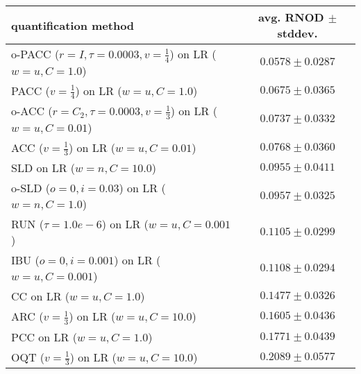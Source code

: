 \begin{tabular}{lc}
  \toprule
  quantification method & avg. RNOD $\pm$ stddev. \\
  \midrule
  o-PACC ($r=I, \tau=0.0003, v=\frac{1}{4}$) on LR ($w=u, C=1.0$) & $\mathbf{0.0578 \pm 0.0287}$ \\
  PACC ($v=\frac{1}{4}$) on LR ($w=u, C=1.0$) & $0.0675 \pm 0.0365$ \\
  o-ACC ($r=C_2, \tau=0.0003, v=\frac{1}{3}$) on LR ($w=u, C=0.01$) & $0.0737 \pm 0.0332$ \\
  ACC ($v=\frac{1}{3}$) on LR ($w=u, C=0.01$) & $0.0768 \pm 0.0360$ \\
  SLD on LR ($w=n, C=10.0$) & $0.0955 \pm 0.0411$ \\
  o-SLD ($o=0, i=0.03$) on LR ($w=n, C=1.0$) & $0.0957 \pm 0.0325$ \\
  RUN ($\tau=1.0e-6$) on LR ($w=u, C=0.001$) & $0.1105 \pm 0.0299$ \\
  IBU ($o=0, i=0.001$) on LR ($w=u, C=0.001$) & $0.1108 \pm 0.0294$ \\
  CC on LR ($w=u, C=1.0$) & $0.1477 \pm 0.0326$ \\
  ARC ($v=\frac{1}{3}$) on LR ($w=u, C=10.0$) & $0.1605 \pm 0.0436$ \\
  PCC on LR ($w=u, C=1.0$) & $0.1771 \pm 0.0439$ \\
  OQT ($v=\frac{1}{3}$) on LR ($w=u, C=10.0$) & $0.2089 \pm 0.0577$ \\
  \bottomrule
\end{tabular}
